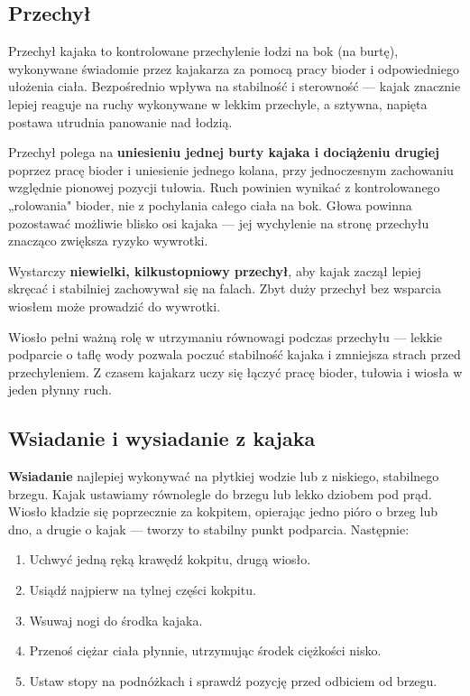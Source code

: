 \subsection{Przechył}

Przechył kajaka to kontrolowane przechylenie łodzi na bok (na burtę), wykonywane świadomie przez kajakarza za pomocą pracy bioder i odpowiedniego ułożenia ciała. Bezpośrednio wpływa
na stabilność i sterowność — kajak znacznie lepiej reaguje na ruchy wykonywane w lekkim przechyle, a sztywna, napięta postawa utrudnia panowanie nad łodzią.

Przechył polega na \textbf{uniesieniu jednej burty kajaka i dociążeniu drugiej} poprzez pracę bioder i uniesienie jednego kolana, przy jednoczesnym zachowaniu względnie pionowej pozycji tułowia. Ruch powinien wynikać z kontrolowanego „rolowania" bioder, nie z pochylania całego ciała na bok. Głowa powinna pozostawać możliwie blisko osi kajaka — jej wychylenie na stronę przechyłu znacząco zwiększa ryzyko wywrotki.

Wystarczy \textbf{niewielki, kilkustopniowy przechył}, aby kajak zaczął lepiej skręcać i stabilniej zachowywał się na falach. Zbyt duży przechył bez wsparcia wiosłem może
prowadzić do wywrotki.

Wiosło pełni ważną rolę w utrzymaniu równowagi podczas przechyłu — lekkie podparcie o taflę wody pozwala poczuć stabilność kajaka i zmniejsza strach przed przechyleniem.
Z czasem kajakarz uczy się łączyć pracę bioder, tułowia i wiosła w jeden płynny ruch.

\subsection{Wsiadanie i wysiadanie z kajaka}

\textbf{Wsiadanie} najlepiej wykonywać na płytkiej wodzie lub z niskiego, stabilnego brzegu. Kajak ustawiamy równolegle do brzegu lub lekko dziobem pod prąd. Wiosło kładzie się
poprzecznie za kokpitem, opierając jedno pióro o brzeg lub dno, a drugie o kajak — tworzy to stabilny punkt podparcia. Następnie:

\begin{enumerate}[leftmargin=1.5em, itemsep=2pt]
  \item Uchwyć jedną ręką krawędź kokpitu, drugą wiosło.
  \item Usiądź najpierw na tylnej części kokpitu.
  \item Wsuwaj nogi do środka kajaka.
  \item Przenoś ciężar ciała płynnie, utrzymując środek ciężkości nisko.
  \item Ustaw stopy na podnóżkach i sprawdź pozycję przed odbiciem od brzegu.
\end{enumerate}

